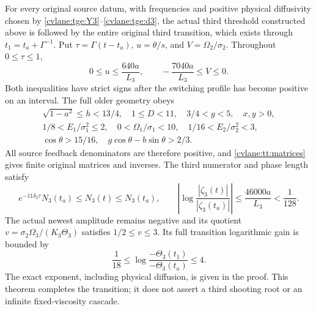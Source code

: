 \begin{cvlanetheorem}\label{cvlane:tt:transition}
For every original source datum, with frequencies and positive physical
diffusivity chosen by \eqref{cvlane:tge:Y3}--\eqref{cvlane:tge:d3}, the actual third
threshold constructed above is followed by the entire original third
transition, which exists
through $t_1=t_a+\Gamma^{-1}$. Put
$\tau=\Gamma(t-t_a)$, $u=\theta/s$, and $V=\Omega_2/\sigma_2$.
Throughout $0\leq\tau\leq1$,
\begin{equation}\label{cvlane:tt:revivalbounds}
 0\leq u\leq\frac{640a}{L_3},\qquad
 -\frac{7040a}{L_3}\leq V\leq0.
\end{equation}
Both inequalities have strict signs after the switching profile has
become positive on an interval. The full older geometry obeys
\begin{equation}\label{cvlane:tt:olderbounds}
\begin{gathered}
 \sqrt{1-a^2}\leq h<13/4,\quad 1\leq D<11,\quad
 3/4<g<5,\quad x,y>0,\\
 1/8<E_1/\sigma_1^2\leq2,\quad
 0<\Omega_1/\sigma_1<10,\quad
 1/16<E_2/\sigma_2^2<3,\\
 \cos\theta>15/16,\quad
 g\cos\theta-b\sin\theta>2/3.
\end{gathered}
\end{equation}
All source feedback denominators are therefore positive, and
\eqref{cvlane:tt:matrices} gives finite original matrices and inverses.
The third numerator and phase length satisfy
\begin{equation}\label{cvlane:tt:coefficientvariation}
 e^{-11\delta_2\tau}N_3(t_a)\leq N_3(t)\leq N_3(t_a),
 \qquad
 \left|\log\frac{|\zeta_3(t)|}{|\zeta_3(t_a)|}\right|
       \leq\frac{46000a}{L_3}<\frac1{128}.
\end{equation}
The actual newest amplitude remains negative and its quotient
$v=\sigma_2\Omega_3/(K_3\Theta_3)$ satisfies $1/2\leq v\leq3$.
Its full transition logarithmic gain is bounded by
\begin{equation}\label{cvlane:tt:gain}
 \frac1{18}\leq\log\frac{-\Theta_3(t_1)}{-\Theta_3(t_a)}\leq4.
\end{equation}
The exact exponent, including physical diffusion, is given in the proof.
This theorem completes the transition; it does not assert a third
shooting root or an infinite fixed-viscosity cascade.
\end{cvlanetheorem}

